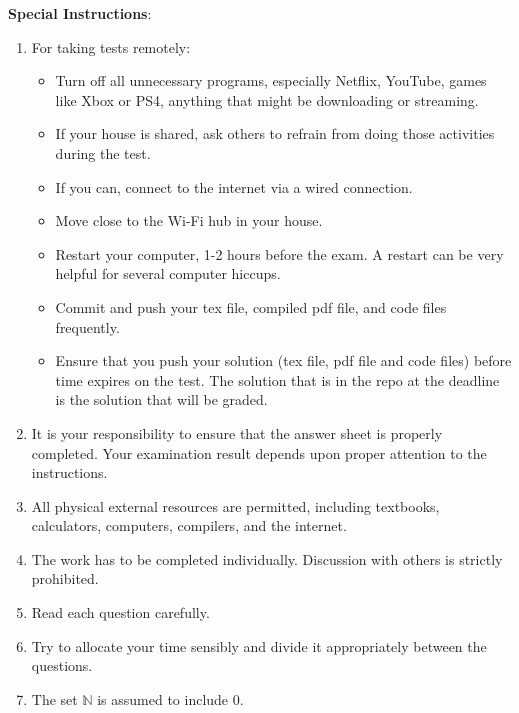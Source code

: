 \documentclass[12pt,fleqn]{examtst}
\begin{document}
\noindent
\textbf{Special Instructions}:

\begin{enumerate}

\item For taking tests remotely:
\begin{itemize}
\item Turn off all unnecessary programs, especially Netflix, YouTube, games like
  Xbox or PS4, anything that might be downloading or streaming.
\item If your house is shared, ask others to refrain from doing those activities
  during the test.
\item If you can, connect to the internet via a wired connection.
\item Move close to the Wi-Fi hub in your house.
\item Restart your computer, 1-2 hours before the exam. A restart can be very
  helpful for several computer hiccups.
\item Commit and push your tex file, compiled pdf file, and code files
  frequently.
\item Ensure that you push your solution (tex file, pdf file and code files)
  before time expires on the test.  The solution that is in the repo at the
  deadline is the solution that will be graded.
\end{itemize}
\item It is your responsibility to ensure that the answer sheet is properly
  completed. Your examination result depends upon proper attention to the
  instructions.
\item All physical external resources are permitted, including textbooks, calculators,
  computers, compilers, and the internet.
\item The work has to be completed individually.  Discussion with others is
  strictly prohibited.
\item Read each question carefully.
\item Try to allocate your time sensibly and divide it appropriately between the
  questions.
\item The set $\mathbb{N}$ is assumed to include $0$.
\end{enumerate}


\renewcommand{\labelenumi}{\Alph{enumi}.}
\end{document}
